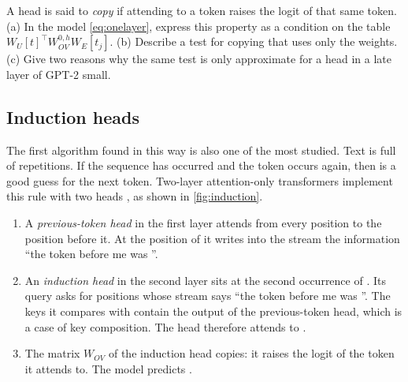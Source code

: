 \begin{exercise}\label{ex:copying}
A head is said to \emph{copy} if attending to a token raises the logit of that same token. (a) In the model
\eqref{eq:onelayer}, express this property as a condition on the table $W_U[t]^\top W_{OV}^{0,h}W_E[t_j]$.
(b) Describe a test for copying that uses only the weights. (c) Give two reasons why the same test is only
approximate for a head in a late layer of GPT-2 small.
\end{exercise}

\subsection{Induction heads}
\label{sec:induction}

The first algorithm found in this way is also one of the most studied. Text is full of repetitions. If the
sequence \tok{[A][B]} has occurred and the token \tok{[A]} occurs again, then \tok{[B]} is a good guess for the
next token. Two-layer attention-only transformers implement this rule with two heads
\citep{elhage2021mathematical}, as shown in \cref{fig:induction}.

\begin{enumerate}
\item A \emph{previous-token head} in the first layer attends from every position to the position before it.
At the position of \tok{[B]} it writes into the stream the information ``the token before me was \tok{[A]}''.
\item An \emph{induction head} in the second layer sits at the second occurrence of \tok{[A]}. Its query asks
for positions whose stream says ``the token before me was \tok{[A]}''. The keys it compares with contain the
output of the previous-token head, which is a case of key composition. The head therefore attends to \tok{[B]}.
\item The matrix $W_{OV}$ of the induction head copies: it raises the logit of the token it attends to. The
model predicts \tok{[B]}.
\end{enumerate}

